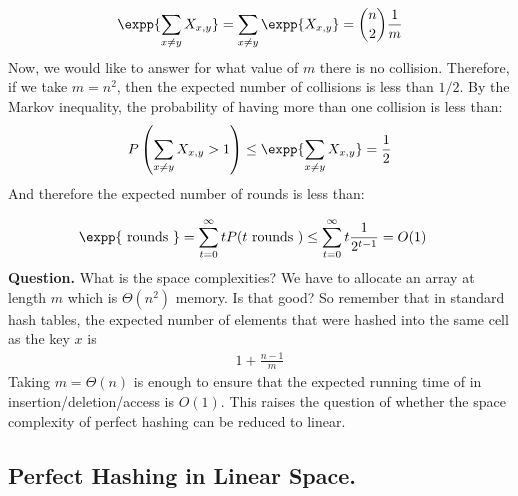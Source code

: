   \begin{equation*}
    \begin{split}
      \expp{\sum_{x\neq y}X_{x,y}} = \sum_{x\neq y}{\expp{X_{x,y}}}= { n \choose 2 } \frac{1}{m}
    \end{split}
  \end{equation*} 
Now, we would like to answer for what value of $m$ there is no collision. Therefore, if we take $m = n^{2}$, then the expected number of collisions is less than $1/2$. By the Markov inequality, the probability of having more than one collision is less than:
  \begin{equation*}
    \begin{split}
      P\left( \sum_{x\neq y}{X_{x,y}} > 1 \right) \le \expp{\sum_{x\neq y}X_{x,y}} = \frac{1}{2}
    \end{split}
  \end{equation*}
  And therefore the expected number of rounds is less than: 
  
  \begin{equation*}
    \begin{split}
      \expp{\text{ rounds }} & = \sum_{t = 0}^{\infty}t P( t \text{ rounds }) \le \sum_{t = 0}^{\infty}t \frac{1}{2^{t-1}} = O(1)
    \end{split}
  \end{equation*}  
  \textbf{Question.} What is the space complexities? We have to allocate an array at length $m$ which is $\Theta(n^{2})$ memory. Is that good? So remember that in standard hash tables, the expected number of elements that were hashed into the same cell as the key $x$ is 
  \begin{equation*}
    \begin{split}
      1 + \frac{n-1}{m} 
    \end{split}
  \end{equation*} 
   Taking $m = \Theta(n)$ is enough to ensure that the expected running time of in insertion/deletion/access is $O(1)$. This raises the question of whether the space complexity of perfect hashing can be reduced to linear.

\subsection{Perfect Hashing in Linear Space.}

